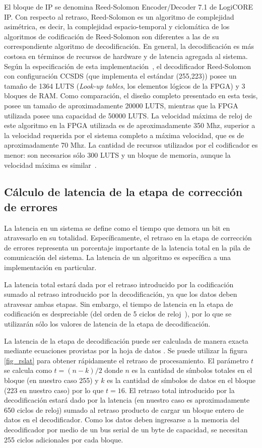 El bloque de IP se denomina Reed-Solomon Encoder/Decoder 7.1 de LogiCORE IP. Con respecto al retraso, Reed-Solomon es un algoritmo de complejidad asimétrica, es decir, la complejidad espacio-temporal y ciclomática \cite{mccabe1976complexity} de los algoritmos de codificación de Reed-Solomon son diferentes a las de su correspondiente algoritmo de decodificación. En general, la decodificación es más costosa en términos de recursos de hardware y de latencia agregada al sistema. Según la especificación de esta implementación~\cite{Xilinx:DS252}, el decodificador Reed-Solomon con configuración CCSDS \cite{coding1999consultative} (que implementa el estándar (255,223)) posee un tamaño de 1364 LUTS (\textit{Look-up tables}, los elementos lógicos de la FPGA) y 3 bloques de RAM. Como comparación, el diseño completo presentado en esta tesis, posee un tamaño de aproximadamente 20000 LUTS, mientras que la FPGA utilizada posee una capacidad de 50000 LUTS. La velocidad máxima de reloj de este algoritmo en la FPGA utilizada es de aproximadamente 350 Mhz, superior a la velocidad requerida por el sistema completo a máxima velocidad, que es de aproximadamente 70 Mhz.
La cantidad de recursos utilizados por el codificador es menor: son necesarios sólo 300 LUTS y un bloque de memoria, aunque la velocidad máxima es similar~\cite{Xilinx:DS251}.

\subsection{Cálculo de latencia de la etapa de corrección de errores}
La latencia en un sistema se define como el tiempo que demora un bit en atravesarlo en su totalidad. Específicamente, el retraso en la etapa de corrección de errores representa un porcentaje importante de la latencia total en la pila de comunicación del sistema. La latencia de un algoritmo es específica a una implementación en particular.

La latencia total estará dada por el retraso introducido por la codificación sumado al retraso introducido por la decodificación, ya que los datos deben atravesar ambas etapas. Sin embargo, el tiempo de latencia en la etapa de codificación es despreciable (del orden de 5 ciclos de reloj~\cite{Xilinx:DS251}), por lo que se utilizarán sólo los valores de latencia de la etapa de decodificación. 

La latencia de la etapa de decodificación puede ser calculada de manera exacta mediante ecuaciones provistas por la hoja de datos \cite{Xilinx:DS252}. Se puede utilizar la figura \ref{fig_rslat} para obtener rápidamente el retraso de procesamiento. El parámetro $t$ se calcula como $t=(n-k)/2$ donde $n$ es la cantidad de símbolos totales en el bloque (en nuestro caso 255) y $k$ es la cantidad de símbolos de datos en el bloque (223 en nuestro caso) por lo que $t=16$.  El retraso total introducido por la decodificación estará dado por la latencia (en nuestro caso es aproximadamente 650 ciclos de reloj) sumado al retraso producto de cargar un bloque entero de datos en el decodificador. Como los datos deben ingresarse a la memoria del decodificador por medio de un bus serial de un byte de capacidad, se necesitan 255 ciclos adicionales por cada bloque. 

